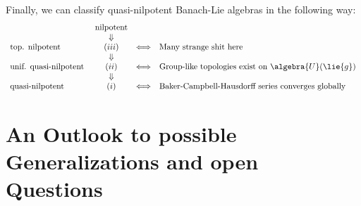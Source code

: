 \documentclass[
11pt,                          %
english                        %
]{article}
\begin{document}
Finally, we can classify quasi-nilpotent Banach-Lie algebras in the following way:
\begin{equation}
	\label{classification}
	\begin{array}{lccl}
		& \text{nilpotent} &
		\\
		& \Downarrow &
		\\
		\text{top. nilpotent } &
		(iii) & \Longleftrightarrow &
		\text{Many strange shit here}
		\\
		& \Downarrow &
		\\
		\text{unif. quasi-nilpotent } &
		(ii) & \Longleftrightarrow &
		\text{Group-like topologies exist on }
		\algebra{U}(\lie{g})
		\\
		& \Downarrow &
		\\
		\text{quasi-nilpotent } &
		(i) & \Longleftrightarrow &
		\text{Baker-Campbell-Hausdorff series converges globally}
	\end{array}
\end{equation}


\section{An Outlook to possible Generalizations and open Questions}
\end{document}
